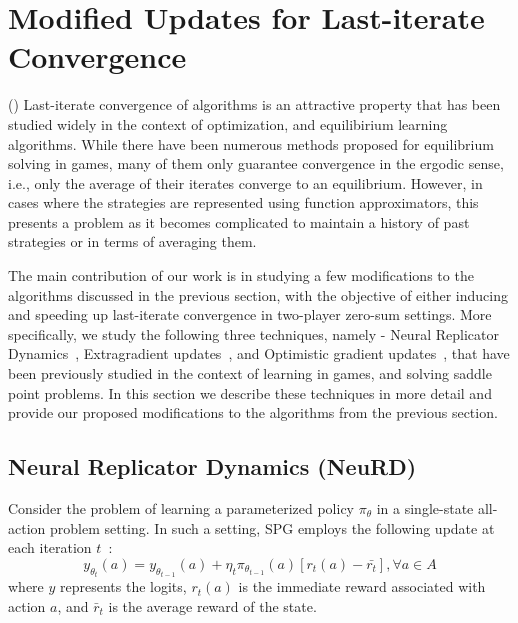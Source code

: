 \chapter{Modified Updates for Last-iterate Convergence}
\label{chp:updates}

()
Last-iterate convergence of algorithms is an attractive property that has been studied widely in the context
of optimization, and equilibirium learning algorithms.
While there have been numerous methods proposed for equilibrium solving in games, many of them only
guarantee convergence in the ergodic sense, i.e., only the average of their iterates converge to an
equilibrium.
However, in cases where the strategies are represented using function approximators, this presents
a problem as it becomes complicated to maintain a history of past strategies or in terms of
averaging them.

The main contribution of our work is in studying a few modifications to the algorithms discussed in
the previous section, with the objective of either inducing and speeding up last-iterate
convergence in two-player zero-sum settings.
More specifically, we study the following three techniques, namely - Neural Replicator
Dynamics~\cite{hennesNeural2020}, Extragradient updates~\cite{korpelevichextragradient1976}, and
Optimistic gradient updates~\cite{popovmodification1980}, that have been previously studied in the
context of learning in games, and solving saddle point problems.
In this section we describe these techniques in more detail and provide our proposed modifications
to the algorithms from the previous section.

\section{Neural Replicator Dynamics (NeuRD)}


Consider the problem of learning a parameterized policy $\pi_{\theta}$ in a single-state all-action
problem setting.
In such a setting, SPG employs the following update at each iteration
$t$~\cite[Section~A.1]{hennesNeural2020}: \[y_{\theta_t}(a) = y_{\theta_{t-1}} (a) + \eta_t
	\pi_{\theta_{t-1}}(a) [r_t(a) - \bar{r_t}], \forall a \in A\] where $y$ represents the logits,
$r_t(a)$ is the immediate reward associated with action $a$, and $\bar{r}_t$ is the average reward
of the state.

